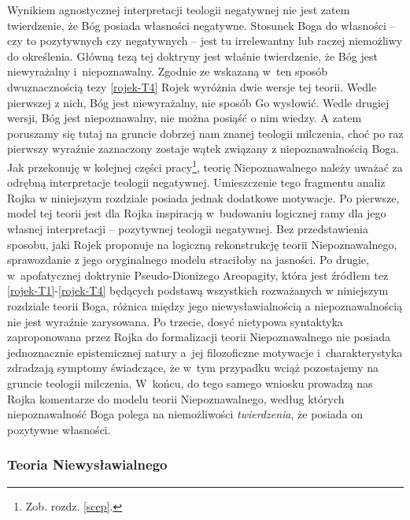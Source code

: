 Wynikiem agnostycznej
interpretacji teologii negatywnej nie jest zatem twierdzenie, że Bóg posiada
własności negatywne. Stosunek Boga do własności -- czy to pozytywnych czy negatywnych -- jest tu irrelewantny lub raczej niemożliwy do określenia. Główną tezą tej doktryny jest właśnie twierdzenie, że Bóg jest niewyrażalny i~niepoznawalny. 
Zgodnie ze wskazaną w~ten sposób dwuznacznością tezy \eqref{rojek-T4}
Rojek wyróżnia dwie wersje tej teorii. Wedle pierwszej z nich, Bóg jest
niewyrażalny, nie sposób Go wysłowić.
Wedle drugiej wersji, Bóg jest
niepoznawalny, nie można posiąść o nim wiedzy.
A zatem poruszamy się tutaj na gruncie dobrzej nam znanej teologii milczenia, choć po raz pierwszy wyraźnie zaznaczony zostaje
wątek związany z niepoznawalnością Boga. Jak przekonuję w kolejnej części pracy\footnote{Zob. rozdz. \ref{scep}.}, teorię Niepoznawalnego należy
uważać za odrębną interpretacje teologii negatywnej. Umieszczenie tego fragmentu analiz Rojka w niniejszym rozdziale posiada jednak dodatkowe motywacje.
Po pierwsze, model tej teorii jest dla Rojka inspiracją w~budowaniu logicznej ramy dla jego własnej interpretacji -- pozytywnej teologii negatywnej. Bez przedstawienia sposobu, jaki Rojek proponuje na logiczną rekonstrukcję teorii Niepoznawalnego, sprawozdanie z jego oryginalnego modelu straciłoby na jasności.
Po drugie, w~apofatycznej doktrynie Pseudo-Dionizego Areopagity, która jest źródłem tez \eqref{rojek-T1}-\eqref{rojek-T4} będących podstawą wszystkich rozważanych w niniejszym rozdziale teorii Boga, różnica między jego niewysławialnością a niepoznawalnością nie jest wyraźnie zarysowana.
Po trzecie, dosyć nietypowa syntaktyka zaproponowana przez Rojka do formalizacji teorii Niepoznawalnego nie posiada jednoznacznie epistemicznej natury a~jej filozoficzne motywacje i~charakterystyka zdradzają symptomy świadczące, że w~tym przypadku wciąż pozostajemy na gruncie teologii milczenia.
W~końcu, do tego samego wniosku prowadzą nas Rojka komentarze do modelu teorii Niepoznawalnego, według których niepoznawalność Boga polega na niemożliwości \textit{twierdzenia}, że posiada on pozytywne własności.




\subsubsection{Teoria Niewysławialnego}

